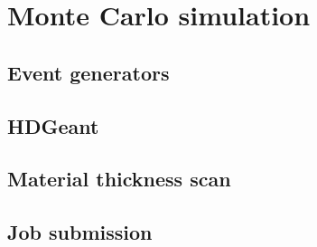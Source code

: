 

\section[Monte Carlo (Richard)]{Monte Carlo simulation \label{sec:simulation}}
\subsection{Event generators \label{sec:generators}}
\subsection{HDGeant \label{sec:hdgeant}}
\subsection{Material thickness scan \label{sec:materialscan}}
\subsection{Job submission \label{sec:jobsubmission}}

